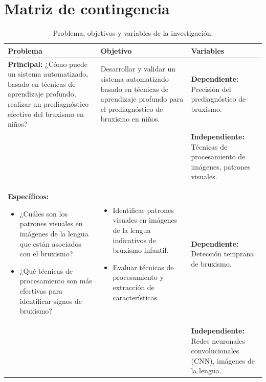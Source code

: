 	\section{Matriz de contingencia}
\begin{table}[H]
    \caption{Problema, objetivos y variables de la investigación.}
    \centering
    \renewcommand{\arraystretch}{1.5} %
    \setlength{\tabcolsep}{10pt} %
    \begin{tabular}{|p{4cm}|p{5cm}|p{6cm}|}
        \hline
        \textbf{Problema} & \textbf{Objetivo} & \textbf{Variables} \\ \hline
        \textbf{Principal:} ¿Cómo puede un sistema automatizado, basado en técnicas de aprendizaje profundo, realizar un prediagnóstico efectivo del bruxismo en niños? 
        & Desarrollar y validar un sistema automatizado basado en técnicas de aprendizaje profundo para el prediagnóstico de bruxismo en niños. 
        & 
        \textbf{Dependiente:} Precisión del prediagnóstico de bruxismo. \\
        & & \textbf{Independiente:} Técnicas de procesamiento de imágenes, patrones visuales. \\ \hline
        \textbf{Específicos:} 
        \begin{itemize}
            \item ¿Cuáles son los patrones visuales en imágenes de la lengua que están asociados con el bruxismo? 
            \item ¿Qué técnicas de procesamiento son más efectivas para identificar signos de bruxismo?
        \end{itemize} 
        & 
        \begin{itemize}
            \item Identificar patrones visuales en imágenes de la lengua indicativos de bruxismo infantil.
            \item Evaluar técnicas de procesamiento y extracción de características.
        \end{itemize} 
        & 
        \textbf{Dependiente:} Detección temprana de bruxismo. \\
        & & \textbf{Independiente:} Redes neuronales convolucionales (CNN), imágenes de la lengua. \\ \hline
    \end{tabular}
\end{table}

	
	\clearpage